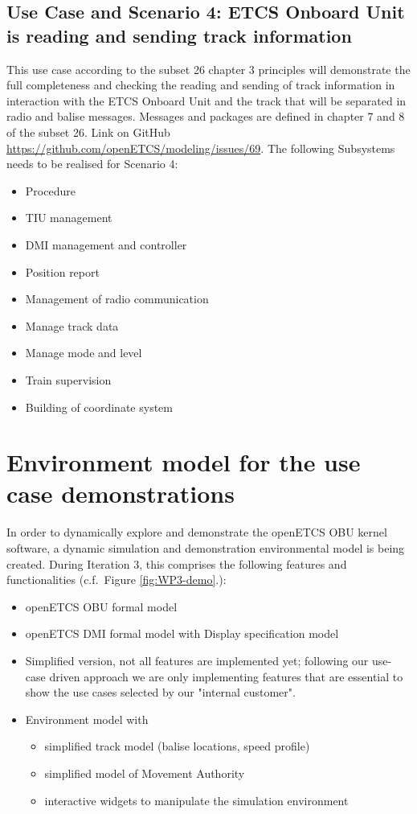 \subsection{Use Case and Scenario 4: ETCS Onboard Unit is reading and sending track information}
This use case according to the subset 26 chapter 3 principles will demonstrate the full completeness and checking the reading and sending of track information in interaction with the ETCS Onboard Unit and the track that will be separated in radio and balise messages. Messages and packages are defined in chapter 7 and 8 of the subset 26. Link on GitHub \url{https://github.com/openETCS/modeling/issues/69}. The following Subsystems needs to be realised for Scenario 4:
\begin{itemize}
\item Procedure
\item TIU management
\item DMI management and controller
\item Position report
\item Management of radio communication
\item Manage track data
\item Manage mode and level
\item Train supervision
\item Building of coordinate system
\end{itemize}

\section{Environment model for the use case demonstrations}

In order to dynamically explore and demonstrate the openETCS OBU kernel software, a dynamic simulation and demonstration environmental model is being created. During Iteration 3, this comprises the following features and functionalities (c.f.~Figure \ref{fig:WP3-demo}.):
\begin{itemize}
\item openETCS OBU formal model
\item openETCS DMI formal model with Display specification model
\item Simplified version, not all features are implemented yet; following our use- case driven approach we are only implementing features that are essential to show the use cases selected by our "internal customer".
\item Environment model with
	\begin{itemize}
	\item simplified track model (balise locations, speed profile)
	\item simplified model of Movement Authority
	\item interactive widgets to manipulate the simulation environment
	\end{itemize}
\end{itemize}

